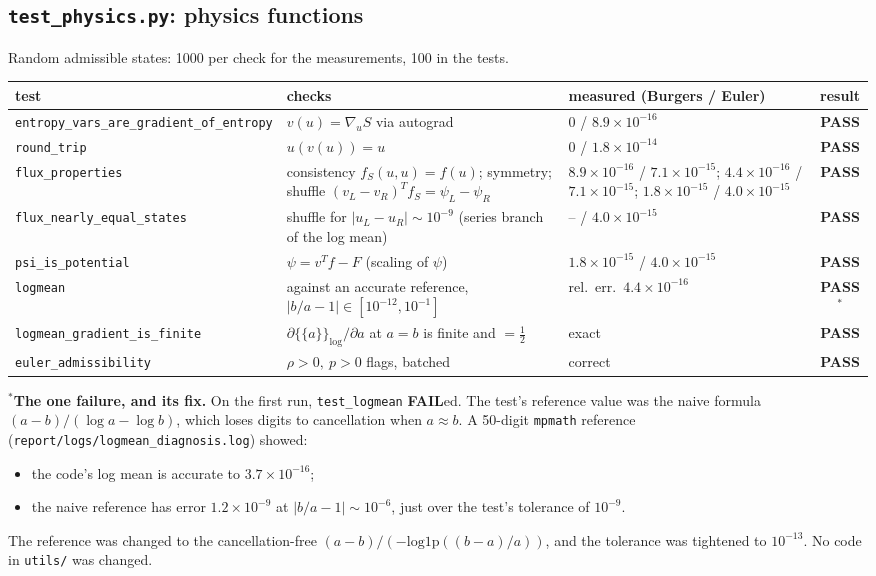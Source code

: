 \documentclass[11pt,a4paper]{article}
\newcommand{\code}[1]{\texttt{\small #1}}
\newcommand{\pass}{\textcolor{green!45!black}{\textbf{PASS}}}
\newcommand{\fail}{\textcolor{red!70!black}{\textbf{FAIL}}}
\begin{document}
\subsection{\code{test\_physics.py}: physics functions}\label{sec:t-physics}
Random admissible states: 1000 per check for the measurements, 100 in the tests.
\begin{center}\small
\begin{tabular}{p{4.3cm}p{5.0cm}p{3.9cm}c}
\toprule
test & checks & measured (Burgers / Euler) & result\\\midrule
\code{entropy\_vars\_are\_gradient\_of\_entropy} & $v(u)=\nabla_uS$ via autograd & $0$ / $8.9\times10^{-16}$ & \pass\\
\code{round\_trip} & $u(v(u))=u$ & $0$ / $1.8\times10^{-14}$ & \pass\\
\code{flux\_properties} & consistency $f_S(u,u)=f(u)$; symmetry; shuffle $(v_L-v_R)^Tf_S=\psi_L-\psi_R$ & $8.9\times10^{-16}$ / $7.1\times10^{-15}$; $4.4\times10^{-16}$ / $7.1\times10^{-15}$; $1.8\times10^{-15}$ / $4.0\times10^{-15}$ & \pass\\
\code{flux\_nearly\_equal\_states} & shuffle for $|u_L-u_R|\sim10^{-9}$ (series branch of the log mean) & -- / $4.0\times10^{-15}$ & \pass\\
\code{psi\_is\_potential} & $\psi=v^Tf-F$ (scaling of $\psi$) & $1.8\times10^{-15}$ / $4.0\times10^{-15}$ & \pass\\
\code{logmean} & against an accurate reference, $|b/a-1|\in[10^{-12},10^{-1}]$ & rel.\ err.\ $4.4\times10^{-16}$ & \pass$^\ast$\\
\code{logmean\_gradient\_is\_finite} & $\partial\{\!\{a\}\!\}_{\log}/\partial a$ at $a=b$ is finite and $=\tfrac12$ & exact & \pass\\
\code{euler\_admissibility} & $\rho>0,\ p>0$ flags, batched & correct & \pass\\
\bottomrule
\end{tabular}
\end{center}
$^\ast$\textbf{The one failure, and its fix.} On the first run, \code{test\_logmean} \fail ed. The test's reference value was the naive formula $(a-b)/(\log a-\log b)$, which loses digits to cancellation when $a\approx b$. A 50-digit \code{mpmath} reference (\code{report/logs/logmean\_diagnosis.log}) showed:
\begin{itemize}
\item the code's log mean is accurate to $3.7\times10^{-16}$;
\item the naive reference has error $1.2\times10^{-9}$ at $|b/a-1|\sim10^{-6}$, just over the test's tolerance of $10^{-9}$.
\end{itemize}
The reference was changed to the cancellation-free $(a-b)/(-\mathrm{log1p}((b-a)/a))$, and the tolerance was tightened to $10^{-13}$. No code in \code{utils/} was changed.
\end{document}
